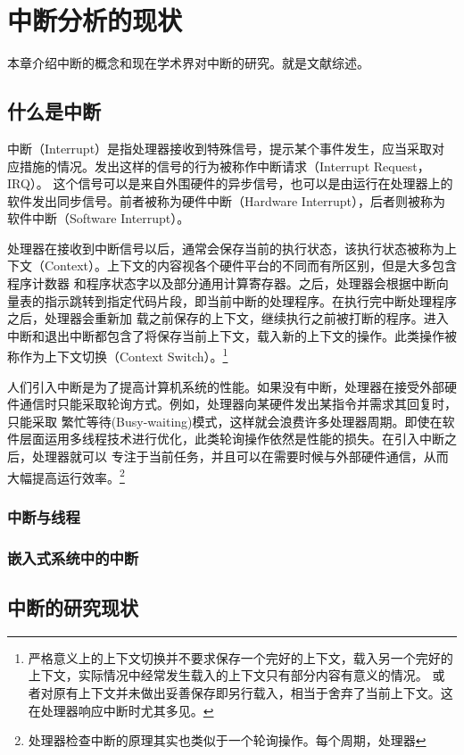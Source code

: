 
\chapter{中断分析的现状}
本章介绍中断的概念和现在学术界对中断的研究。就是文献综述。

\section{什么是中断}
中断（Interrupt）是指处理器接收到特殊信号，提示某个事件发生，应当采取对应措施的情况。发出这样的信号的行为被称作中断请求（Interrupt Request，IRQ）。
这个信号可以是来自外围硬件的异步信号，也可以是由运行在处理器上的软件发出同步信号。前者被称为硬件中断（Hardware Interrupt），后者则被称为软件中断（Software Interrupt）。

处理器在接收到中断信号以后，通常会保存当前的执行状态，该执行状态被称为上下文（Context）。上下文的内容视各个硬件平台的不同而有所区别，但是大多包含程序计数器
和程序状态字以及部分通用计算寄存器。之后，处理器会根据中断向量表的指示跳转到指定代码片段，即当前中断的处理程序。在执行完中断处理程序之后，处理器会重新加
载之前保存的上下文，继续执行之前被打断的程序。进入中断和退出中断都包含了将保存当前上下文，载入新的上下文的操作。此类操作被称作为上下文切换（Context Switch）。\footnote{严格意义上的上下文切换并不要求保存一个完好的上下文，载入另一个完好的上下文，实际情况中经常发生载入的上下文只有部分内容有意义的情况。
或者对原有上下文并未做出妥善保存即另行载入，相当于舍弃了当前上下文。这在处理器响应中断时尤其多见。}

人们引入中断是为了提高计算机系统的性能。如果没有中断，处理器在接受外部硬件通信时只能采取轮询方式。例如，处理器向某硬件发出某指令并需求其回复时，只能采取
繁忙等待(Busy-waiting)模式，这样就会浪费许多处理器周期。即使在软件层面运用多线程技术进行优化，此类轮询操作依然是性能的损失。在引入中断之后，处理器就可以
专注于当前任务，并且可以在需要时候与外部硬件通信，从而大幅提高运行效率。\footnote{处理器检查中断的原理其实也类似于一个轮询操作。每个周期，处理器}

\subsection{中断与线程}
\subsection{嵌入式系统中的中断}

\section{中断的研究现状}